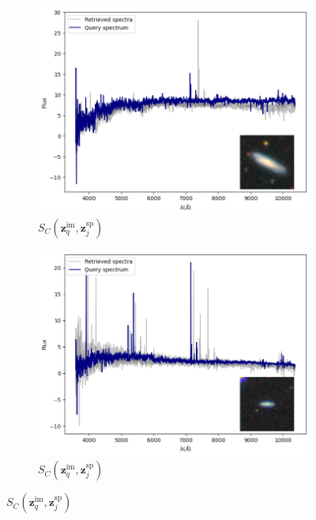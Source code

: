 \documentclass[a4paper,12pt]{article}
\begin{document}
\begin{figure}[H]
    \begin{subfigure}[b]{0.45\textwidth}
        \centering
        \includegraphics[width=\textwidth]{../figures/spectral_retrieval_sp_im_1}
        \caption{$S_C(\mathbf{z}_q^{\text{im}}, \mathbf{z}_j^{\text{sp}})$}
        \label{fig:sp_im_1}
    \end{subfigure}%
    \hfill
    \begin{subfigure}[b]{0.45\textwidth}
        \centering
        \includegraphics[width=\textwidth]{../figures/spectral_retrieval_sp_im_2}
        \caption{$S_C(\mathbf{z}_q^{\text{im}}, \mathbf{z}_j^{\text{sp}})$}
        \label{fig:sp_im_2}
    \end{subfigure}


\end{figure}
\end{document}

